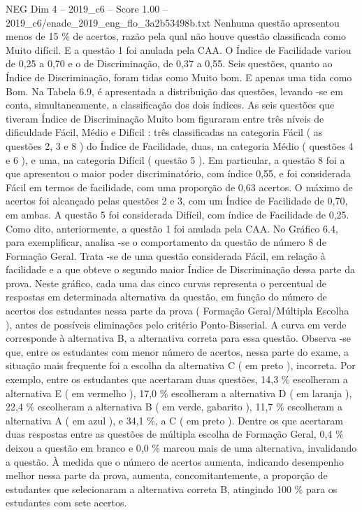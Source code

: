 \begin{textsample}{NEG Dim 4 – 2019\_c6 – Score 1.00 – 2019\_c6/enade\_2019\_eng\_flo\_3a2b53498b.txt}
Nenhuma questão apresentou menos de 15 \% de acertos, razão pela qual não houve questão classificada como Muito difícil.
E a questão 1 foi anulada pela CAA.
O Índice de Facilidade variou de 0,25 a 0,70 e o de Discriminação, de 0,37 a 0,55.
Seis questões, quanto ao Índice de Discriminação, foram tidas como Muito bom.
E apenas uma tida como Bom.
Na Tabela 6.9, é apresentada a distribuição das questões, levando -se em conta, simultaneamente, a classificação dos dois índices.
As seis questões que tiveram Índice de Discriminação Muito bom figuraram entre três níveis de dificuldade Fácil, Médio e Difícil : três classificadas na categoria Fácil ( as questões 2, 3 e 8 ) do Índice de Facilidade, duas, na categoria Médio ( questões 4 e 6 ), e uma, na categoria Difícil ( questão 5 ).
Em particular, a questão 8 foi a que apresentou o maior poder discriminatório, com índice 0,55, e foi considerada Fácil em termos de facilidade, com uma proporção de 0,63 acertos.
O máximo de acertos foi alcançado pelas questões 2 e 3, com um Índice de Facilidade de 0,70, em ambas.
A questão 5 foi considerada Difícil, com índice de Facilidade de 0,25.
Como dito, anteriormente, a questão 1 foi anulada pela CAA.
No Gráfico 6.4, para exemplificar, analisa -se o comportamento da questão de número 8 de Formação Geral.
Trata -se de uma questão considerada Fácil, em relação à facilidade e a que obteve o segundo maior Índice de Discriminação dessa parte da prova.
Neste gráfico, cada uma das cinco curvas representa o percentual de respostas em determinada alternativa da questão, em função do número de acertos dos estudantes nessa parte da prova ( Formação Geral/Múltipla Escolha ), antes de possíveis eliminações pelo critério Ponto-Bisserial.
A curva em verde corresponde à alternativa B, a alternativa correta para essa questão.
Observa -se que, entre os estudantes com menor número de acertos, nessa parte do exame, a situação mais frequente foi a escolha da alternativa C ( em preto ), incorreta.
Por exemplo, entre os estudantes que acertaram duas questões, 14,3 \% escolheram a alternativa E ( em vermelho ), 17,0 \% escolheram a alternativa D ( em laranja ), 22,4 \% escolheram a alternativa B ( em verde, gabarito ), 11,7 \% escolheram a alternativa A ( em azul ), e 34,1 \%, a C ( em preto ).
Dentre os que acertaram duas respostas entre as questões de múltipla escolha de Formação Geral, 0,4 \% deixou a questão em branco e 0,0 \% marcou mais de uma alternativa, invalidando a questão.
À medida que o número de acertos aumenta, indicando desempenho melhor nessa parte da prova, aumenta, concomitantemente, a proporção de estudantes que selecionaram a alternativa correta B, atingindo 100 \% para os estudantes com sete acertos.

\end{textsample}
